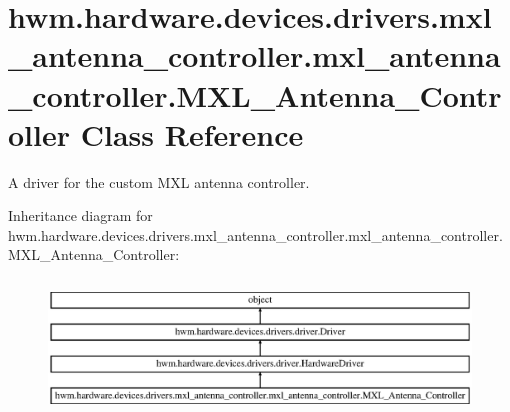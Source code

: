 \hypertarget{classhwm_1_1hardware_1_1devices_1_1drivers_1_1mxl__antenna__controller_1_1mxl__antenna__controll300dc396624a0e0bda412a3b1ecea20c}{\section{hwm.\-hardware.\-devices.\-drivers.\-mxl\-\_\-antenna\-\_\-controller.\-mxl\-\_\-antenna\-\_\-controller.\-M\-X\-L\-\_\-\-Antenna\-\_\-\-Controller Class Reference}
\label{classhwm_1_1hardware_1_1devices_1_1drivers_1_1mxl__antenna__controller_1_1mxl__antenna__controll300dc396624a0e0bda412a3b1ecea20c}
}


A driver for the custom M\-X\-L antenna controller.  


Inheritance diagram for hwm.\-hardware.\-devices.\-drivers.\-mxl\-\_\-antenna\-\_\-controller.\-mxl\-\_\-antenna\-\_\-controller.\-M\-X\-L\-\_\-\-Antenna\-\_\-\-Controller\-:\begin{figure}[H]
\begin{center}
\leavevmode
\includegraphics[height=3.654160cm]{classhwm_1_1hardware_1_1devices_1_1drivers_1_1mxl__antenna__controller_1_1mxl__antenna__controll300dc396624a0e0bda412a3b1ecea20c}
\end{center}
\end{figure}
